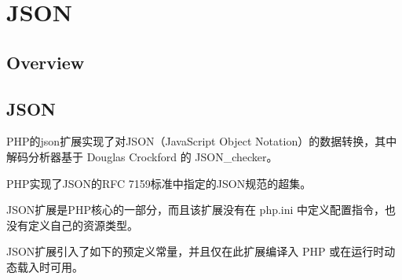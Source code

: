 \part{JSON}

\chapter{Overview}

\chapter{JSON}


PHP的json扩展实现了对JSON（JavaScript Object Notation）的数据转换，其中解码分析器基于 Douglas Crockford 的 JSON\_checker。

PHP实现了JSON的RFC 7159标准中指定的JSON规范的超集。


JSON扩展是PHP核心的一部分，而且该扩展没有在 php.ini 中定义配置指令，也没有定义自己的资源类型。

JSON扩展引入了如下的预定义常量，并且仅在此扩展编译入 PHP 或在运行时动态载入时可用。



